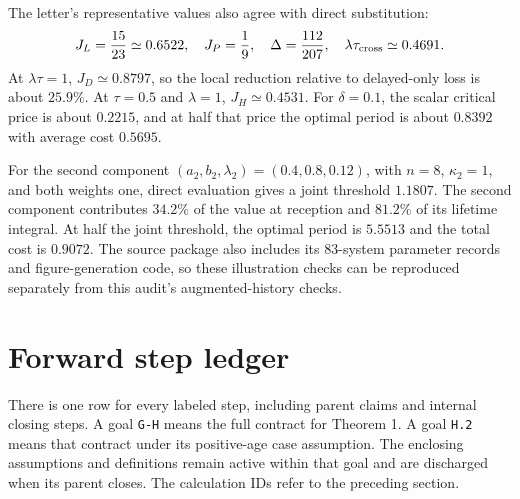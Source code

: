 \documentclass[11pt,letterpaper]{article}
\begin{document}
The letter's representative values also agree with direct substitution:
\[
J_L=\frac{15}{23}\simeq0.6522,\quad J_P=\frac19,
\quad\Delta=\frac{112}{207},\quad
\lambda\tau_{\rm cross}\simeq0.4691.
\]
At $\lambda\tau=1$, $J_D\simeq0.8797$, so the local reduction relative to delayed-only loss is about $25.9\%$. At $\tau=0.5$ and $\lambda=1$, $J_H\simeq0.4531$. For $\delta=0.1$, the scalar critical price is about $0.2215$, and at half that price the optimal period is about $0.8392$ with average cost $0.5695$.

For the second component $(a_2,b_2,\lambda_2)=(0.4,0.8,0.12)$, with $n=8$, $\kappa_2=1$, and both weights one, direct evaluation gives a joint threshold $1.1807$. The second component contributes $34.2\%$ of the value at reception and $81.2\%$ of its lifetime integral. At half the joint threshold, the optimal period is $5.5513$ and the total cost is $0.9072$. The source package also includes its 83-system parameter records and figure-generation code, so these illustration checks can be reproduced separately from this audit's augmented-history checks.

\section{Forward step ledger}
There is one row for every labeled step, including parent claims and internal closing steps. A goal \texttt{G-H} means the full contract for Theorem 1. A goal \texttt{H.2} means that contract under its positive-age case assumption. The enclosing assumptions and definitions remain active within that goal and are discharged when its parent closes. The calculation IDs refer to the preceding section.
\end{document}
